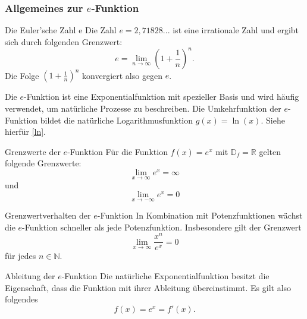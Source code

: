 \subsubsection{Allgemeines zur $e$-Funktion}
\begin{satz}{Die Euler'sche Zahl e}{}
Die Zahl $e=2,71828...$ ist eine irrationale Zahl und ergibt sich durch folgenden Grenzwert: $$e= \lim_{n\longrightarrow \infty} \left(1+ \dfrac{1}{n}\right)^n.$$ Die Folge $\left(1+\frac{1}{n}\right)^n$ konvergiert also gegen $e$.   
\end{satz}
Die $e$-Funktion ist eine Exponentialfunktion mit spezieller Basis und wird häufig verwendet, um natürliche Prozesse zu beschreiben. Die Umkehrfunktion der $e$-Funktion bildet die natürliche Logarithmusfunktion $g(x) = \ln{(x)}$. Siehe hierfür \ref{ln}.
\begin{center}
\end{center}
\begin{bem}{Grenzwerte der $e$-Funktion}{}
Für die Funktion $f(x) = e^x$ mit $\mathds{D}_f = \mathds{R}$ gelten folgende Grenzwerte: $$\lim_{x\longrightarrow \infty} e^x = \infty$$ und $$\lim_{x\longrightarrow -\infty} e^x = 0$$ 
\end{bem}
\begin{satz}{Grenzwertverhalten der $e$-Funktion}{}
In Kombination mit Potenzfunktionen wächst die $e$-Funktion schneller als jede Potenzfunktion. Insbesondere gilt der Grenzwert $$\lim_{x\longrightarrow \infty} \dfrac{x^n}{e^x} = 0$$ für jedes $n\in \mathds{N}$.
\end{satz}
\begin{satz}{Ableitung der $e$-Funktion}{}
Die natürliche Exponentialfunktion besitzt die Eigenschaft, dass die Funktion mit ihrer Ableitung übereinstimmt. Es gilt also folgendes $$f(x) = e^x = f'(x).$$
\end{satz}
